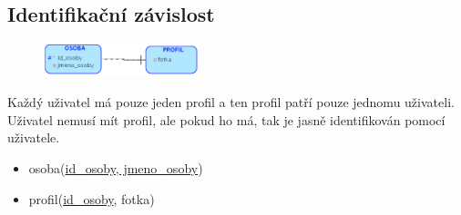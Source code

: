 \documentclass{szzclass}
\begin{document}
\subsection{Identifikační závislost}
\begin{figure}[h!]
    \centering
    \includegraphics[width=0.4\textwidth]{topics/bi-wsi-si-02/images/idenRelation.png}
\end{figure}
Každý uživatel má pouze jeden profil a ten profil patří pouze jednomu uživateli. Uživatel nemusí mít profil, ale pokud ho má, tak je jasně
identifikován pomocí uživatele.
\begin{itemize}
    \item osoba(\underline{id\_osoby, jmeno\_osoby})
    \item profil(\underline{id\_osoby}, fotka)
\end{itemize}
\end{document}
